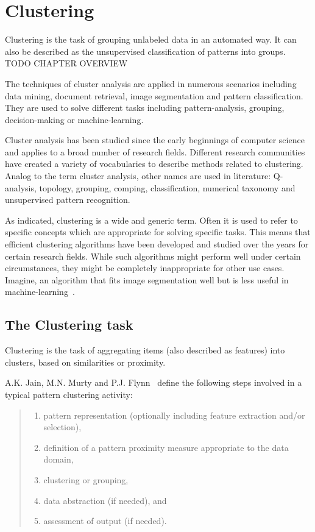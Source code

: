 \section{Clustering}

Clustering is the task of grouping unlabeled data in an automated way. It can also be described as the unsupervised classification of patterns into groups. TODO CHAPTER OVERVIEW

The techniques of cluster analysis are applied in numerous scenarios including data mining, document retrieval, image segmentation and pattern classification. They are used to solve different tasks including pattern-analysis, grouping, decision-making or machine-learning.

Cluster analysis has been studied since the early beginnings of computer science and applies to a broad number of research fields. Different research communities have created a variety of vocabularies to describe methods related to clustering. Analog to the term cluster analysis, other names are used in literature: Q-analysis, topology, grouping, comping, classification, numerical taxonomy and unsupervised pattern recognition.

As indicated, clustering is a wide and generic term. Often it is used to refer to specific concepts which are appropriate for solving specific tasks. This means that efficient clustering algorithms have been developed and studied over the years for certain research fields. While such algorithms might perform well under certain circumstances, they might be completely inappropriate for other use cases. Imagine, an algorithm that  fits image segmentation well but is less useful in machine-learning~\cite{Meert06clustermaps, Jain99clusterreview}. 


\subsection{The Clustering task}

Clustering is the task of aggregating items (also described as features) into clusters, based on similarities or proximity.

A.K. Jain, M.N. Murty and P.J. Flynn~\cite{Jain99clusterreview} define the following steps involved in a typical pattern clustering activity:
 
\begin{quote}
\begin{enumerate}
\item pattern representation (optionally including feature extraction and/or selection), 
\item definition of a pattern proximity measure appropriate to the data domain, 
\item clustering or grouping, 
\item data abstraction (if needed), and 
\item assessment of output (if needed). 
\end{enumerate}
\end{quote}

